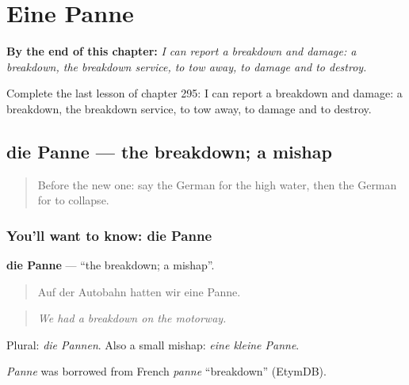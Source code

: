 
\chapter{Eine Panne}
\label{ch:ge-eine-panne}

\begin{chapteropening}
\textbf{By the end of this chapter:} \emph{I can report a breakdown and damage: a breakdown, the breakdown service, to tow away, to damage and to destroy.}

Complete the last lesson of chapter 295: I can report a breakdown and damage: a breakdown, the breakdown service, to tow away, to damage and to destroy.
\end{chapteropening}

\section[die Panne]{die Panne — the breakdown; a mishap}

\label{lesson:GE-C295-panne}



\begin{quote}
Before the new one: say the German for the high water, then the German for to collapse.
\end{quote}

\subsection*{You'll want to know: die Panne}
\textbf{die Panne} — \textquotedblleft{}the breakdown; a mishap\textquotedblright{}.

\begin{quote}
Auf der Autobahn hatten wir eine Panne.
\end{quote}

\begin{quote}
\emph{We had a breakdown on the motorway.}
\end{quote}

Plural: \emph{die Pannen}. Also a small mishap: \emph{eine kleine Panne}.

\begin{cousinweb}
\emph{Panne} was borrowed from French \emph{panne} \textquotedblleft{}breakdown\textquotedblright{} (EtymDB).
\end{cousinweb}

